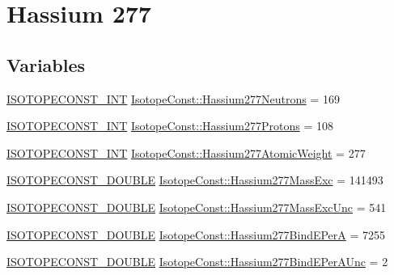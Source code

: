 \hypertarget{group___isotope_const-_hassium-_hs277}{}\section{Hassium 277}
\label{group___isotope_const-_hassium-_hs277}
\subsection*{Variables}
\begin{DoxyCompactItemize}
\item 
\mbox{\hyperlink{group___isotope_const-_macros_ga5f18360b3e99483a35c32d789e62621c}{I\+S\+O\+T\+O\+P\+E\+C\+O\+N\+S\+T\+\_\+\+I\+NT}} \mbox{\hyperlink{group___isotope_const-_hassium-_hs277_ga08c1fbbf179e6aad7e1bec882bdc98f4}{Isotope\+Const\+::\+Hassium277\+Neutrons}} = 169
\item 
\mbox{\hyperlink{group___isotope_const-_macros_ga5f18360b3e99483a35c32d789e62621c}{I\+S\+O\+T\+O\+P\+E\+C\+O\+N\+S\+T\+\_\+\+I\+NT}} \mbox{\hyperlink{group___isotope_const-_hassium-_hs277_gaad6fe30dbd9a453ada6d915eb05df3e8}{Isotope\+Const\+::\+Hassium277\+Protons}} = 108
\item 
\mbox{\hyperlink{group___isotope_const-_macros_ga5f18360b3e99483a35c32d789e62621c}{I\+S\+O\+T\+O\+P\+E\+C\+O\+N\+S\+T\+\_\+\+I\+NT}} \mbox{\hyperlink{group___isotope_const-_hassium-_hs277_ga28d988e1b59aa8fee42ca809d222a55a}{Isotope\+Const\+::\+Hassium277\+Atomic\+Weight}} = 277
\item 
\mbox{\hyperlink{group___isotope_const-_macros_ga8f45a7272ce02c0b4c65c44636ed719a}{I\+S\+O\+T\+O\+P\+E\+C\+O\+N\+S\+T\+\_\+\+D\+O\+U\+B\+LE}} \mbox{\hyperlink{group___isotope_const-_hassium-_hs277_gae2b15ef69cbc59c60317cad7c6398f29}{Isotope\+Const\+::\+Hassium277\+Mass\+Exc}} = 141493
\item 
\mbox{\hyperlink{group___isotope_const-_macros_ga8f45a7272ce02c0b4c65c44636ed719a}{I\+S\+O\+T\+O\+P\+E\+C\+O\+N\+S\+T\+\_\+\+D\+O\+U\+B\+LE}} \mbox{\hyperlink{group___isotope_const-_hassium-_hs277_gae04d919cd93d0b25286b27c9834bd5e9}{Isotope\+Const\+::\+Hassium277\+Mass\+Exc\+Unc}} = 541
\item 
\mbox{\hyperlink{group___isotope_const-_macros_ga8f45a7272ce02c0b4c65c44636ed719a}{I\+S\+O\+T\+O\+P\+E\+C\+O\+N\+S\+T\+\_\+\+D\+O\+U\+B\+LE}} \mbox{\hyperlink{group___isotope_const-_hassium-_hs277_ga33efc33b539d50b8556cb4790451ca30}{Isotope\+Const\+::\+Hassium277\+Bind\+E\+PerA}} = 7255
\item 
\mbox{\hyperlink{group___isotope_const-_macros_ga8f45a7272ce02c0b4c65c44636ed719a}{I\+S\+O\+T\+O\+P\+E\+C\+O\+N\+S\+T\+\_\+\+D\+O\+U\+B\+LE}} \mbox{\hyperlink{group___isotope_const-_hassium-_hs277_ga9e47c9203b113746bdd3211fa9dc4e90}{Isotope\+Const\+::\+Hassium277\+Bind\+E\+Per\+A\+Unc}} = 2

\end{DoxyCompactItemize}
